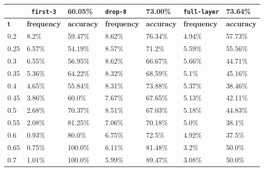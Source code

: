 
\begin{table}[t]
\centering
\begin{tabular}{lllllll} %
\hline

\multicolumn{1}{c}{}& 
\multicolumn{1}{c}{\texttt{first-3}} & \multicolumn{1}{l|}{60.05\%} 
& \multicolumn{1}{l}{\texttt{drop-8}} & \multicolumn{1}{l|}{73.00\%}
& \multicolumn{1}{l}{\texttt{full-layer}} & 73.64\%
\\ \hline
\multicolumn{1}{l|}{\textbf{t}} &
\multicolumn{1}{l|}{\textbf{frequency}} & 
\multicolumn{1}{l|}{\textbf{accuracy}} & 
\multicolumn{1}{l|}{\textbf{frequency}} & 
\multicolumn{1}{l|}{\textbf{accuracy}} & 
\multicolumn{1}{l|}{\textbf{frequency}} & 
\multicolumn{1}{l|}{\textbf{accuracy}} \\ \hline
	\multicolumn{1}{l|}{0.2}&  8.2\% & \multicolumn{1}{l|}{59.47\%}& 8.62\% & \multicolumn{1}{l|}{76.34\%}& 4.94\% & 57.73\%\\ 
\multicolumn{1}{l|}{0.25}&  6.57\% & \multicolumn{1}{l|}{54.19\%}& 8.57\% & \multicolumn{1}{l|}{71.2\%}& 5.59\% & 55.56\%\\ 
\multicolumn{1}{l|}{0.3}&  6.55\% & \multicolumn{1}{l|}{56.95\%}& 8.62\% & \multicolumn{1}{l|}{66.67\%}& 5.66\% & 44.71\%\\ 
\multicolumn{1}{l|}{0.35}&  5.36\% & \multicolumn{1}{l|}{64.22\%}& 8.32\% & \multicolumn{1}{l|}{68.59\%}& 5.1\% & 45.16\%\\ 
\multicolumn{1}{l|}{0.4}&  4.65\% & \multicolumn{1}{l|}{55.84\%}& 8.31\% & \multicolumn{1}{l|}{73.88\%}& 5.37\% & 38.46\%\\ 
\multicolumn{1}{l|}{0.45}&  3.86\% & \multicolumn{1}{l|}{60.0\%}& 7.67\% & \multicolumn{1}{l|}{67.65\%}& 5.13\% & 42.11\%\\ 
\multicolumn{1}{l|}{0.5}&  2.68\% & \multicolumn{1}{l|}{70.37\%}& 8.51\% & \multicolumn{1}{l|}{67.03\%}& 5.18\% & 44.83\%\\ 
\multicolumn{1}{l|}{0.55}&  2.08\% & \multicolumn{1}{l|}{81.25\%}& 7.06\% & \multicolumn{1}{l|}{70.18\%}& 5.0\% & 38.1\%\\ 
\multicolumn{1}{l|}{0.6}&  0.93\% & \multicolumn{1}{l|}{80.0\%}& 6.75\% & \multicolumn{1}{l|}{72.5\%}& 4.92\% & 37.5\%\\ 
\multicolumn{1}{l|}{0.65}&  0.75\% & \multicolumn{1}{l|}{100.0\%}& 6.11\% & \multicolumn{1}{l|}{81.48\%}& 3.2\% & 50.0\%\\ 
\multicolumn{1}{l|}{0.7}&  1.01\% & \multicolumn{1}{l|}{100.0\%}& 5.99\% & \multicolumn{1}{l|}{89.47\%}& 3.08\% & 50.0\%\\ 

\end{tabular}
\end{table}
